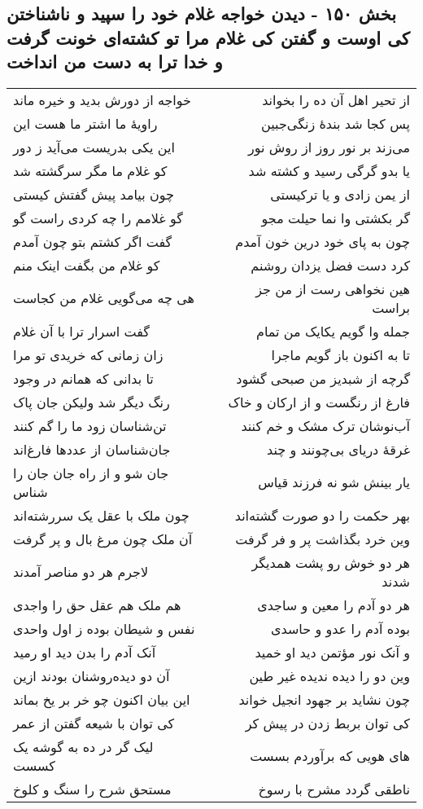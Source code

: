 \begin{center}
\section*{بخش ۱۵۰ - دیدن خواجه غلام خود را سپید و ناشناختن کی اوست و گفتن کی غلام مرا تو کشته‌ای خونت گرفت و خدا ترا به دست من انداخت}
\label{sec:sh150}
\begin{longtable}{l p{0.5cm} r}
خواجه از دورش بدید و خیره ماند
&&
از تحیر اهل آن ده را بخواند
\\
راویهٔ ما اشتر ما هست این
&&
پس کجا شد بندهٔ زنگی‌جبین
\\
این یکی بدریست می‌آید ز دور
&&
می‌زند بر نور روز از روش نور
\\
کو غلام ما مگر سرگشته شد
&&
یا بدو گرگی رسید و کشته شد
\\
چون بیامد پیش گفتش کیستی
&&
از یمن زادی و یا ترکیستی
\\
گو غلامم را چه کردی راست گو
&&
گر بکشتی وا نما حیلت مجو
\\
گفت اگر کشتم بتو چون آمدم
&&
چون به پای خود درین خون آمدم
\\
کو غلام من بگفت اینک منم
&&
کرد دست فضل یزدان روشنم
\\
هی چه می‌گویی غلام من کجاست
&&
هین نخواهی رست از من جز براست
\\
گفت اسرار ترا با آن غلام
&&
جمله وا گویم یکایک من تمام
\\
زان زمانی که خریدی تو مرا
&&
تا به اکنون باز گویم ماجرا
\\
تا بدانی که همانم در وجود
&&
گرچه از شبدیز من صبحی گشود
\\
رنگ دیگر شد ولیکن جان پاک
&&
فارغ از رنگست و از ارکان و خاک
\\
تن‌شناسان زود ما را گم کنند
&&
آب‌نوشان ترک مشک و خم کنند
\\
جان‌شناسان از عددها فارغ‌اند
&&
غرقهٔ دریای بی‌چونند و چند
\\
جان شو و از راه جان جان را شناس
&&
یار بینش شو نه فرزند قیاس
\\
چون ملک با عقل یک سررشته‌اند
&&
بهر حکمت را دو صورت گشته‌اند
\\
آن ملک چون مرغ بال و پر گرفت
&&
وین خرد بگذاشت پر و فر گرفت
\\
لاجرم هر دو مناصر آمدند
&&
هر دو خوش رو پشت همدیگر شدند
\\
هم ملک هم عقل حق را واجدی
&&
هر دو آدم را معین و ساجدی
\\
نفس و شیطان بوده ز اول واحدی
&&
بوده آدم را عدو و حاسدی
\\
آنک آدم را بدن دید او رمید
&&
و آنک نور مؤتمن دید او خمید
\\
آن دو دیده‌روشنان بودند ازین
&&
وین دو را دیده ندیده غیر طین
\\
این بیان اکنون چو خر بر یخ بماند
&&
چون نشاید بر جهود انجیل خواند
\\
کی توان با شیعه گفتن از عمر
&&
کی توان بربط زدن در پیش کر
\\
لیک گر در ده به گوشه یک کسست
&&
های هویی که برآوردم بسست
\\
مستحق شرح را سنگ و کلوخ
&&
ناطقی گردد مشرح با رسوخ
\\
\end{longtable}
\end{center}
